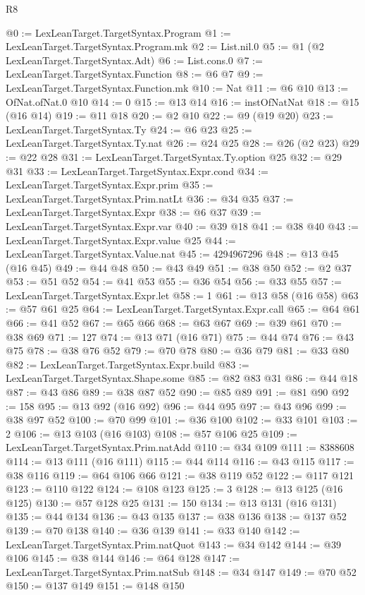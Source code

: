 \begin{lexlean}{R8}
\begin{coremodule}
@0 := LexLeanTarget.TargetSyntax.Program
@1 := LexLeanTarget.TargetSyntax.Program.mk
@2 := List.nil.{0}
@5 := @1 (@2 LexLeanTarget.TargetSyntax.Adt)
@6 := List.cons.{0}
@7 := LexLeanTarget.TargetSyntax.Function
@8 := @6 @7
@9 := LexLeanTarget.TargetSyntax.Function.mk
@10 := Nat
@11 := @6 @10
@13 := OfNat.ofNat.{0} @10
@14 := 0
@15 := @13 @14
@16 := instOfNatNat
@18 := @15 (@16 @14)
@19 := @11 @18
@20 := @2 @10
@22 := @9 (@19 @20)
@23 := LexLeanTarget.TargetSyntax.Ty
@24 := @6 @23
@25 := LexLeanTarget.TargetSyntax.Ty.nat
@26 := @24 @25
@28 := @26 (@2 @23)
@29 := @22 @28
@31 := LexLeanTarget.TargetSyntax.Ty.option @25
@32 := @29 @31
@33 := LexLeanTarget.TargetSyntax.Expr.cond
@34 := LexLeanTarget.TargetSyntax.Expr.prim
@35 := LexLeanTarget.TargetSyntax.Prim.natLt
@36 := @34 @35
@37 := LexLeanTarget.TargetSyntax.Expr
@38 := @6 @37
@39 := LexLeanTarget.TargetSyntax.Expr.var
@40 := @39 @18
@41 := @38 @40
@43 := LexLeanTarget.TargetSyntax.Expr.value @25
@44 := LexLeanTarget.TargetSyntax.Value.nat
@45 := 4294967296
@48 := @13 @45 (@16 @45)
@49 := @44 @48
@50 := @43 @49
@51 := @38 @50
@52 := @2 @37
@53 := @51 @52
@54 := @41 @53
@55 := @36 @54
@56 := @33 @55
@57 := LexLeanTarget.TargetSyntax.Expr.let
@58 := 1
@61 := @13 @58 (@16 @58)
@63 := @57 @61 @25
@64 := LexLeanTarget.TargetSyntax.Expr.call
@65 := @64 @61
@66 := @41 @52
@67 := @65 @66
@68 := @63 @67
@69 := @39 @61
@70 := @38 @69
@71 := 127
@74 := @13 @71 (@16 @71)
@75 := @44 @74
@76 := @43 @75
@78 := @38 @76 @52
@79 := @70 @78
@80 := @36 @79
@81 := @33 @80
@82 := LexLeanTarget.TargetSyntax.Expr.build
@83 := LexLeanTarget.TargetSyntax.Shape.some
@85 := @82 @83 @31
@86 := @44 @18
@87 := @43 @86
@89 := @38 @87 @52
@90 := @85 @89
@91 := @81 @90
@92 := 158
@95 := @13 @92 (@16 @92)
@96 := @44 @95
@97 := @43 @96
@99 := @38 @97 @52
@100 := @70 @99
@101 := @36 @100
@102 := @33 @101
@103 := 2
@106 := @13 @103 (@16 @103)
@108 := @57 @106 @25
@109 := LexLeanTarget.TargetSyntax.Prim.natAdd
@110 := @34 @109
@111 := 8388608
@114 := @13 @111 (@16 @111)
@115 := @44 @114
@116 := @43 @115
@117 := @38 @116
@119 := @64 @106 @66
@121 := @38 @119 @52
@122 := @117 @121
@123 := @110 @122
@124 := @108 @123
@125 := 3
@128 := @13 @125 (@16 @125)
@130 := @57 @128 @25
@131 := 150
@134 := @13 @131 (@16 @131)
@135 := @44 @134
@136 := @43 @135
@137 := @38 @136
@138 := @137 @52
@139 := @70 @138
@140 := @36 @139
@141 := @33 @140
@142 := LexLeanTarget.TargetSyntax.Prim.natQuot
@143 := @34 @142
@144 := @39 @106
@145 := @38 @144
@146 := @64 @128
@147 := LexLeanTarget.TargetSyntax.Prim.natSub
@148 := @34 @147
@149 := @70 @52
@150 := @137 @149
@151 := @148 @150

\end{coremodule}
\end{lexlean}
